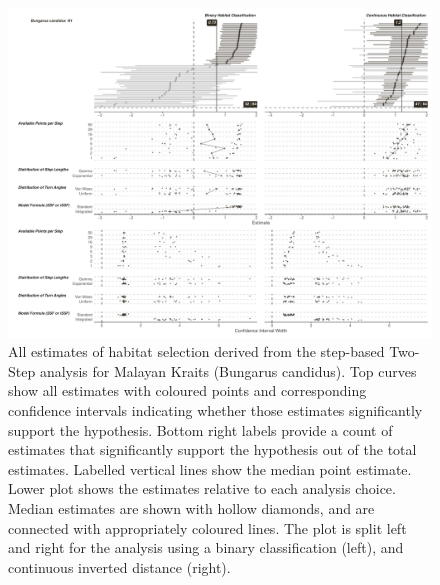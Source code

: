 \documentclass[10pt,a4paper]{article}
\begin{document}
\begin{figure}
\includegraphics[width=1\linewidth]{../../figures/specCurve_Bungarus candidus_twoStep} \caption{All estimates of habitat selection derived from the step-based Two-Step analysis for Malayan Kraits (Bungarus candidus). Top curves show all estimates with coloured points and corresponding confidence intervals indicating whether those estimates significantly support the hypothesis. Bottom right labels provide a count of estimates that significantly support the hypothesis out of the total estimates. Labelled vertical lines show the median point estimate. Lower plot shows the estimates relative to each analysis choice. Median estimates are shown with hollow diamonds, and are connected with appropriately coloured lines. The plot is split left and right for the analysis using a binary classification (left), and continuous inverted distance (right).}\label{fig:specCurveTwoStepBUCA}
\end{figure}
\end{document}
